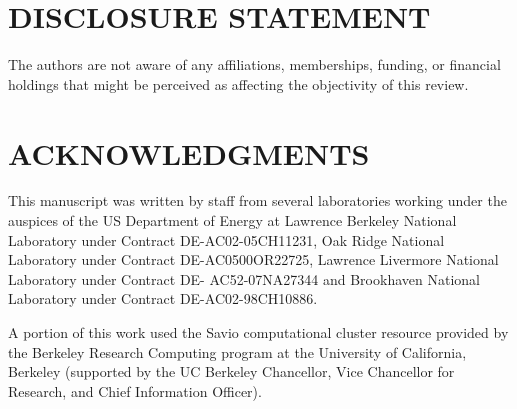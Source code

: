 \documentclass[letterpaper]{ar-1col}
\begin{document}
% 
% 

\section*{DISCLOSURE STATEMENT}
The authors are not aware of any affiliations, memberships, funding, or financial holdings that
might be perceived as affecting the objectivity of this review. 

\section*{ACKNOWLEDGMENTS}

This manuscript was written by staff from several laboratories working under the auspices of the US Department of Energy at Lawrence Berkeley National Laboratory under Contract DE-AC02-05CH11231, Oak Ridge National Laboratory under Contract DE-AC0500OR22725, Lawrence Livermore National Laboratory under Contract DE- AC52-07NA27344 and Brookhaven National Laboratory under Contract DE-AC02-98CH10886. 

A portion of this work used the Savio computational cluster resource provided by the Berkeley Research Computing program at the University of California, Berkeley (supported by the UC Berkeley Chancellor, Vice Chancellor for Research, and Chief Information Officer).
\end{document}
